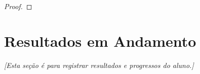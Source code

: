 \documentclass[reqno, 12pt]{amsart}
\numberwithin{equation}{section}
\theoremstyle{plain}
\theoremstyle{definition}
\begin{document}
\begin{proof}
  
\end{proof}

\vspace{0.5cm}

\section{Resultados em Andamento}

\emph{[Esta seção é para registrar resultados e progressos do aluno.]}

\vspace{1cm}

\printbibliography
\end{document}
